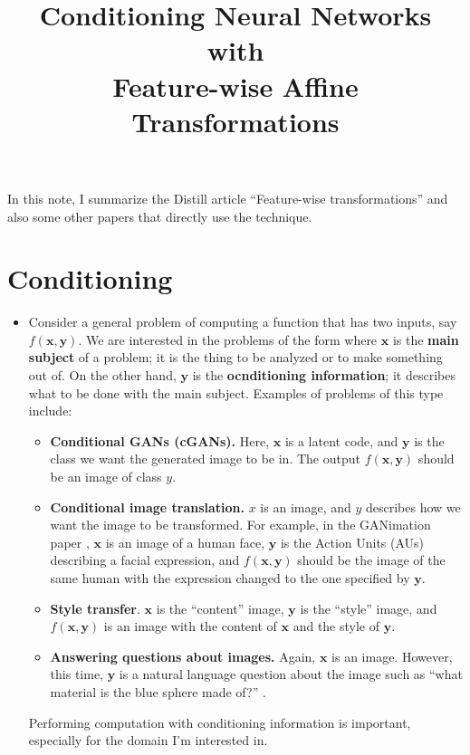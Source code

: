 \documentclass[10pt]{article}
\title{Conditioning Neural Networks with\\Feature-wise Affine Transformations}
\newcommand{\ve}[1]{\mathbf{#1}}
\begin{document}
  \maketitle

  In this note, I summarize the Distill article ``Feature-wise transformations'' \cite{Dumoulin:2018} and also some other papers that directly use the technique.

  \section{Conditioning}

  \begin{itemize}
  	\item Consider a general problem of computing a function that has two inputs, say $f(\ve{x},\ve{y})$. We are interested in the problems of the form where $\ve{x}$ is the \textbf{main subject} of a problem; it is the thing to be analyzed or to make something out of. On the other hand, $\ve{y}$ is the \textbf{ocnditioning information}; it describes what to be done with the main subject. Examples of problems of this type include:
  	\begin{itemize}
  		\item \textbf{Conditional GANs (cGANs).} Here, $\ve{x}$ is a latent code, and $\ve{y}$ is the class we want the generated image to be in. The output $f(\ve{x},\ve{y})$ should be an image of class $y$.

  		\item \textbf{Conditional image translation.} $x$ is an image, and $y$ describes how we want the image to be transformed. For example, in the GANimation paper \cite{Pumarola:2019}, $\ve{x}$ is an image of a human face, $\ve{y}$ is the Action Units (AUs) describing a facial expression, and $f(\ve{x},\ve{y})$ should be the image of the same human with the expression changed to the one specified by $\ve{y}$.

  		\item \textbf{Style transfer}. $\ve{x}$ is the ``content'' image, $\ve{y}$ is the ``style'' image, and $f(\ve{x},\ve{y})$ is an image with the content of $\ve{x}$ and the style of $\ve{y}$.

  		\item \textbf{Answering questions about images.} Again, $\ve{x}$ is an image. However, this time, $\ve{y}$ is a natural language question about the image such as ``what material is the blue sphere made of?'' \cite{Johnson:2016}.
  	\end{itemize}
  	Performing computation with conditioning information is important, especially for the domain I'm interested in.


\end{itemize}
\end{document}
